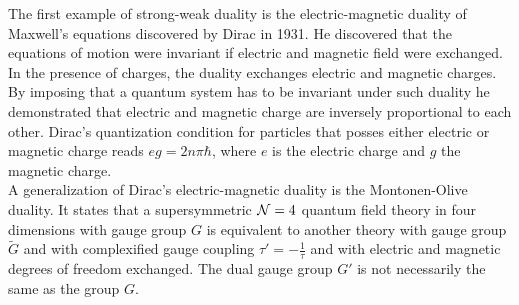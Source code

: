 The first example of strong-weak duality is the electric-magnetic duality of Maxwell's equations discovered by Dirac in 1931.  
He discovered that the equations of motion were invariant if electric and magnetic field were exchanged. 
In the presence of charges, the duality exchanges electric and magnetic charges. \\
By imposing that a quantum system has to be invariant under such duality he demonstrated that electric and magnetic charge are inversely proportional to each other. 
Dirac's quantization condition for particles that posses either electric or magnetic charge reads $e g =  2 n \pi \hbar$, where $e$ is the electric charge and $g$ the magnetic charge.\\

A generalization of Dirac's electric-magnetic duality is the Montonen-Olive duality.
It states that a supersymmetric  $\mathcal{N}=4$ quantum field theory in four dimensions with gauge group $G$ is equivalent to another theory with gauge group $\tilde{G}$ and with complexified gauge coupling $\tau' = - \frac{1}{\tau}$ and with electric and magnetic degrees of freedom exchanged.
The dual gauge group $G'$ is not necessarily the same as the group $G$.
\\

